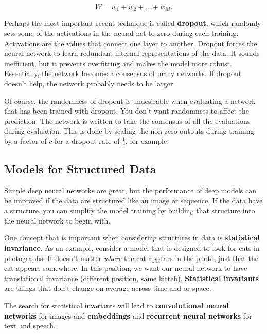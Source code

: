 \begin{equation}
	W = w_{1} + w_{2} + ... + w_{M}.
\end{equation}

Perhaps the most important recent technique is called \textbf{dropout}, which randomly sets some of the activations in the neural net to zero during each training. Activations are the values that connect one layer to another. Dropout forces the neural network to learn redundant internal representations of the data. It sounds inefficient, but it prevents overfitting and makes the model more robust. Essentially, the network becomes a consensus of many networks. If dropout doesn't help, the network probably needs to be larger. 

Of course, the randomness of dropout is undesirable when evaluating a network that has been trained with dropout. You don't want randomness to affect the prediction. The network is written to take the consensus of all the evaluations during evaluation. This is done by scaling the non-zero outputs during training by a factor of $c$ for a dropout rate of $\frac{1}{c}$, for example. 

\subsection{Models for Structured Data}

Simple deep neural networks are great, but the performance of deep models can be improved if the data are structured like an image or sequence. If the data have a structure, you can simplify the model training by building that structure into the neural network to begin with. 

One concept that is important when considering structures in data is \textbf{statistical invariance}. As an example, consider a model that is designed to look for cats in photographs. It doesn't matter \textit{where} the cat appears in the photo, just that the cat appears somewhere. In this position, we want our neural network to have translational invariance (different position, same kitteh). \textbf{Statistical invariants} are things that don't change on average across time and or space. 

The search for statistical invariants will lead to \textbf{convolutional neural networks} for images and \textbf{embeddings} and \textbf{recurrent neural networks} for text and speech. 

